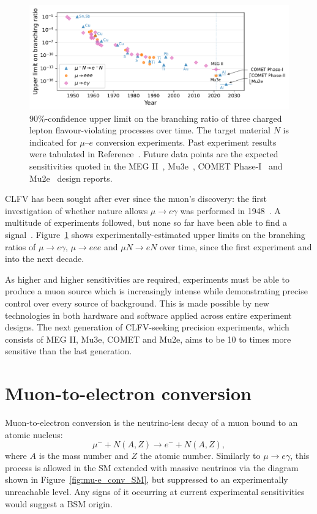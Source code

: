\begin{figure}
    \centering
    \includegraphics[width=\textwidth]{chapter1/clfv_upper_limit_v2.pdf}
    \caption{
        90\%-confidence upper limit on the branching ratio of three charged
        lepton flavour-violating processes over time. 
        The target material $N$ is indicated for $\mu$--$e$ conversion experiments.
        Past experiment results
        were tabulated in Reference~\cite{BERNSTEIN201327}. Future data points are the
        expected sensitivities quoted in the MEG II~\cite{Baldini2018},
        Mu3e~\cite{ARNDT2021165679}, COMET
        Phase-I~\cite{the_comet_collaboration_comet_2020} and
        Mu2e~\cite{bartoszek2015mu2e} design reports.
    }
    \label{fig:clfv_upper_limit}
\end{figure}

CLFV has been sought after ever since the muon's discovery: the first
investigation of whether nature allows $\mu \rightarrow e \gamma$ was performed
in 1948~\cite{PhysRev.73.257}. A multitude of experiments followed, but none so
far have been able to find a signal~\cite{BERNSTEIN201327}.
Figure~\ref{fig:clfv_upper_limit} shows experimentally-estimated upper limits on
the branching ratios of $\mu \rightarrow e\gamma$, $\mu\rightarrow eee$ and $\mu
N \rightarrow e N$ over time, since the first experiment and into the next
decade. 

As higher and higher sensitivities are required, experiments must be able to
produce a muon source which is increasingly intense while demonstrating
precise control over every source of background. This is made possible by new
technologies in both hardware and software applied across entire experiment
designs. The next generation of CLFV-seeking precision experiments, which
consists of MEG II, Mu3e, COMET and Mu2e, aims to be 10 to 
times more sensitive than the last generation.


\section{Muon-to-electron conversion}
Muon-to-electron conversion is the neutrino-less decay of a muon bound to an
atomic nucleus:
$$
\mu^- + N(A, Z) \rightarrow e^- + N(A, Z),
$$
where $A$ is the mass number and $Z$ the atomic number.
Similarly to $\mu\rightarrow e\gamma$, this process is allowed in the SM
extended with massive neutrinos via the diagram shown in
Figure~\ref{fig:mu-e_conv_SM}, but suppressed to an experimentally
unreachable level. Any signs of it occurring at current experimental
sensitivities would suggest a BSM origin.


